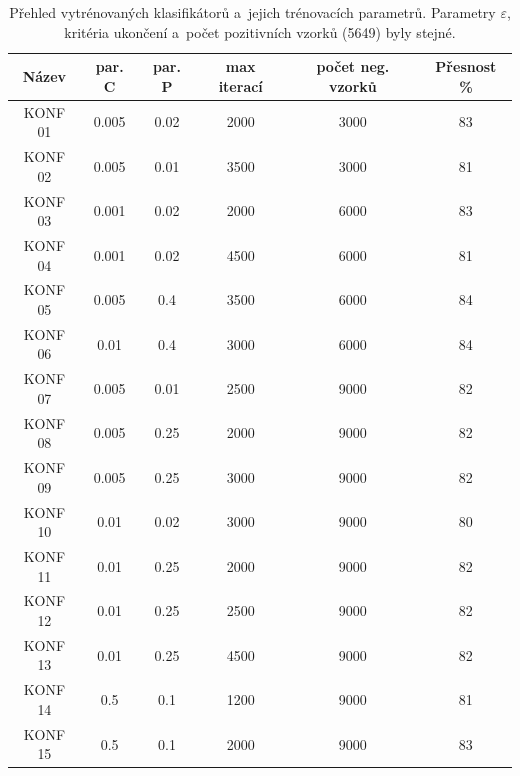 \begin{table}[H]
\centering
\caption{Přehled vytrénovaných klasifikátorů a~jejich trénovacích parametrů. Parametry $\varepsilon$, kritéria ukončení a~počet pozitivních vzorků (5649) byly stejné.}
\begin{tabular} { |c|c|c|c|c|c| }
\hline
{Název}        & {par. C}     & {par. P}      & {max iterací} & {počet neg. vzorků} & {Přesnost \%}  \\ \hline
KONF 01		& 	0.005	& 	  0.02	 &   2000   	  &		  3000   	    &        83	 \\ \hline
KONF 02		& 	0.005	& 	  0.01	 &   3500   	  &		  3000   	    &        81	 \\ \hline
KONF 03		& 	0.001	& 	  0.02	 &   2000   	  &		  6000   	    &        83	 \\ \hline
KONF 04		& 	0.001	& 	  0.02	 &   4500   	  &		  6000   	    &        81	 \\ \hline
KONF 05		& 	0.005	& 	  0.4 	 &   3500   	  &		  6000   	    &        84	 \\ \hline
KONF 06		& 	0.01 	& 	  0.4 	 &   3000   	  &		  6000   	    &        84	 \\ \hline
KONF 07		& 	0.005	& 	  0.01	 &   2500   	  &		  9000   	    &        82	 \\ \hline
KONF 08		& 	0.005	& 	  0.25	 &   2000   	  &		  9000   	    &        82	 \\ \hline
KONF 09		& 	0.005	& 	  0.25	 &   3000   	  &		  9000   	    &        82	 \\ \hline
KONF 10 	     & 	0.01 	& 	  0.02	 &   3000   	  &		  9000   	    &        80	 \\ \hline
KONF 11 	     & 	0.01 	& 	  0.25	 &   2000   	  &		  9000   	    &        82	 \\ \hline
KONF 12 	     & 	0.01 	& 	  0.25	 &   2500   	  &		  9000   	    &        82	 \\ \hline
KONF 13 	     & 	0.01 	& 	  0.25	 &   4500   	  &		  9000   	    &        82	 \\ \hline
KONF 14 	     & 	0.5	 	& 	  0.1	 &   1200   	  &		  9000   	    &        81	 \\ \hline
KONF 15 	     & 	0.5		& 	  0.1	 &   2000   	  &		  9000   	    &        83	 \\ \hline
\end{tabular}
\label{classTab1}
\end{table}

